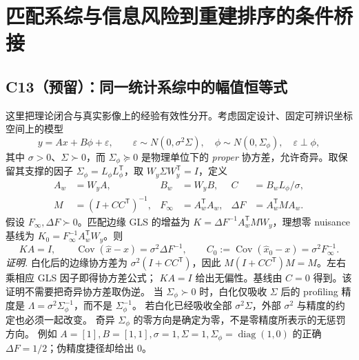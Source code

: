 \section{匹配系综与信息风险到重建排序的条件桥接}
\label{sec:ensemble-bridge}

\subsection{C13（预留）：同一统计系综中的幅值恒等式}
这里把理论闭合与真实影像上的经验有效性分开。考虑固定设计、固定可辨识坐标空间上的模型
\begin{equation}
 y=A x+B\phi+\varepsilon,\qquad
 \varepsilon\sim N(0,\sigma^2\Sigma),\quad
 \phi\sim N(0,\Sigma_\phi),\quad \varepsilon\perp\phi,
 \label{eq:eb-model}
\end{equation}
其中 $\sigma>0$、$\Sigma\succ0$，而 $\Sigma_\phi\succeq0$ 是物理单位下的
\emph{proper} 协方差，允许奇异。取保留其支撑的因子
$\Sigma_\phi=L_\phi L_\phi^{\mathsf T}$，取
$W_y\Sigma W_y^{\mathsf T}=I$，定义
\begin{equation}
 \begin{aligned}
 A_w&=W_y A,& B_w&=W_y B,& C&=B_w L_\phi/\sigma,\\
 M&=(I+CC^{\mathsf T})^{-1},&
 F_\infty&=A_w^{\mathsf T}A_w,&
 \Delta F&=A_w^{\mathsf T}MA_w.
 \end{aligned}
 \label{eq:eb-information}
\end{equation}
假设 $F_\infty,\Delta F\succ0$。匹配边缘 GLS 的增益为
$K=\Delta F^{-1}A_w^{\mathsf T}MW_y$，理想零 nuisance 基线为
$K_0=F_\infty^{-1}A_w^{\mathsf T}W_y$。则
\begin{equation}
 KA=I,\qquad
 \operatorname{Cov}(\widehat x-x)=\sigma^2\Delta F^{-1},\qquad
 C_0:=\operatorname{Cov}(\widehat x_0-x)=\sigma^2 F_\infty^{-1}.
 \label{eq:eb-covariance}
\end{equation}
\emph{证明.}
白化后的边缘协方差为 $\sigma^2(I+CC^{\mathsf T})$，因此
$M(I+CC^{\mathsf T})M=M$。左右乘相应 GLS 因子即得协方差公式；
$KA=I$ 给出无偏性。基线由 $C=0$ 得到。该证明不需要把奇异协方差取伪逆。
当 $\Sigma_\phi\succ0$ 时，白化仅吸收 $\Sigma$ 后的 profiling 精度是
$\Lambda=\sigma^2\Sigma_\phi^{-1}$，而不是 $\Sigma_\phi^{-1}$。
若白化已经吸收全部 $\sigma^2\Sigma$，外部 $\sigma^2$ 与精度的约定也必须一起改变。
奇异 $\Sigma_\phi$ 的零方向是确定为零，不是零精度所表示的无惩罚方向。
例如 $A=[1],B=[1,1],\sigma=1,\Sigma=1,\Sigma_\phi=\operatorname{diag}(1,0)$
的正确 $\Delta F=1/2$；伪精度捷径却给出 $0$。

